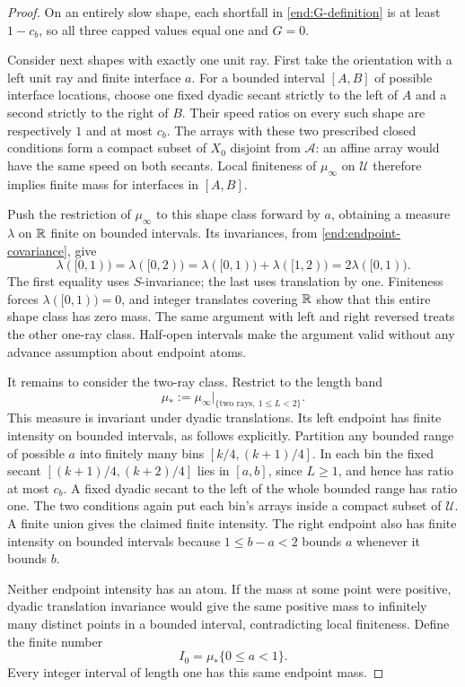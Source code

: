 \begin{proof}
On an entirely slow shape, each shortfall in
\cref{end:G-definition} is at least $1-c_b$, so all three capped values
equal one and $G=0$.

Consider next shapes with exactly one unit ray.  First take the
orientation with a left unit ray and finite interface $a$.
For a bounded interval $[A,B]$ of possible interface locations, choose
one fixed dyadic secant strictly to the left of $A$ and a second strictly
to the right of $B$.  Their speed ratios on every such shape are
respectively $1$ and at most $c_b$.  The arrays with these two prescribed
closed conditions form a compact subset of $X_0$ disjoint from
$\mathcal A$: an affine array would have the same speed on both secants.
Local finiteness of $\mu_\infty$ on $\mathcal U$ therefore implies finite
mass for interfaces in $[A,B]$.

Push the restriction of $\mu_\infty$ to this shape class forward by $a$,
obtaining a measure $\lambda$ on $\mathbb{R}$ finite on bounded intervals.
Its invariances, from \cref{end:endpoint-covariance}, give
\[
 \lambda([0,1))=\lambda([0,2))
 =\lambda([0,1))+\lambda([1,2))=2\lambda([0,1)).
\]
The first equality uses $S$-invariance; the last uses translation by
one.  Finiteness forces $\lambda([0,1))=0$, and integer translates
covering $\mathbb{R}$ show that this entire shape class has zero mass.  The same
argument with left and right reversed treats the other one-ray class.
Half-open intervals make the argument valid without any advance
assumption about endpoint atoms.

It remains to consider the two-ray class.  Restrict to the length band
\[
 \mu_*:=\mu_\infty\big|_{\{\text{two rays},\ 1\le L<2\}}.
\]
This measure is invariant under dyadic translations.  Its left endpoint
has finite intensity on bounded intervals, as follows explicitly.
Partition any bounded range of possible $a$ into finitely many bins
$[k/4,(k+1)/4]$.  In each bin the fixed secant
$[(k+1)/4,(k+2)/4]$ lies in $[a,b]$, since $L\ge1$, and hence has ratio
at most $c_b$.  A fixed dyadic secant to the left of the whole bounded
range has ratio one.  The two conditions again put each bin's arrays
inside a compact subset of $\mathcal U$.  A finite union gives the
claimed finite intensity.  The right endpoint also has finite intensity
on bounded intervals because $1\le b-a<2$ bounds $a$ whenever it bounds
$b$.

Neither endpoint intensity has an atom.  If the mass at some point were
positive, dyadic translation invariance would give the same positive
mass to infinitely many distinct points in a bounded interval,
contradicting local finiteness.  Define the finite number
\[
 I_0=\mu_*\{0\le a<1\}.
\]
Every integer interval of length one has this same endpoint mass.


\end{proof}
